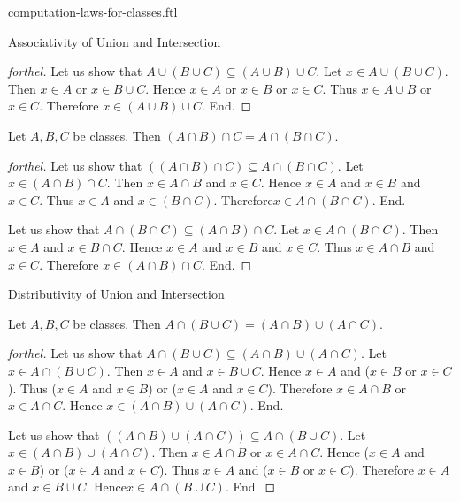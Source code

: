 \documentclass{naproche-library}
\begin{document}
\begin{smodule}[title=Computation Laws For Classes]{computation-laws-for-classes.ftl}
\begin{sfragment}{Associativity of Union and Intersection}
\begin{proof}[forthel]
    Let us show that $A \cup (B \cup C) \subseteq (A \cup B) \cup C$.
      Let $x \in A \cup (B \cup C)$.
      Then $x \in A$ or $x \in B \cup C$.
      Hence $x \in A$ or $x \in B$ or $x \in C$.
      Thus $x \in A \cup B$ or $x \in C$.
      Therefore $x \in (A \cup B) \cup C$.
    End.
  \end{proof}

  \begin{proposition}[forthel,id=FOUNDATIONS_02_906751977193472]
    Let $A, B, C$ be classes.
    Then $(A \cap B) \cap C = A \cap (B \cap C)$.
  \end{proposition}
  \begin{proof}[forthel]
    Let us show that $((A \cap B) \cap C) \subseteq A \cap (B \cap C)$. %
      Let $x \in (A \cap B) \cap C$.
      Then $x \in A \cap B$ and $x \in C$.
      Hence $x \in A$ and $x \in B$ and $x \in C$.
      Thus $x \in A$ and $x \in (B \cap C)$.
      Therefore$ x \in A \cap (B \cap C)$.
    End.

    Let us show that $A \cap (B \cap C) \subseteq (A \cap B) \cap C$.
      Let $x \in A \cap (B \cap C)$.
      Then $x \in A$ and $x \in B \cap C$.
      Hence $x \in A$ and $x \in B$ and $x \in C$.
      Thus $x \in A \cap B$ and $x \in C$.
      Therefore $x \in (A \cap B) \cap C$.
    End.
  \end{proof}
\end{sfragment}

\begin{sfragment}{Distributivity of Union and Intersection}
  \begin{proposition}[forthel,id=FOUNDATIONS_02_371139087958016]
    Let $A, B, C$ be classes.
    Then $A \cap (B \cup C) = (A \cap B) \cup (A \cap C)$.
  \end{proposition}
  \begin{proof}[forthel]
    Let us show that $A \cap (B \cup C) \subseteq (A \cap B) \cup (A \cap C)$.
      Let $x \in A \cap (B \cup C)$.
      Then $x \in A$ and $x \in B \cup C$.
      Hence $x \in A$ and ($x \in B$ or $x \in C$).
      Thus ($x \in A$ and $x \in B$) or ($x \in A$ and $x \in C$).
      Therefore $x \in A \cap B$ or $x \in A \cap C$.
      Hence $x \in (A \cap B) \cup (A \cap C)$.
    End.

    Let us show that $((A \cap B) \cup (A \cap C)) \subseteq A \cap (B \cup C)$. %
      Let $x \in (A \cap B) \cup (A \cap C)$.
      Then $x \in A \cap B$ or $x \in A \cap C$.
      Hence ($x \in A$ and $x \in B$) or ($x \in A$ and $x \in C$).
      Thus $x \in A$ and ($x \in B$ or $x \in C$).
      Therefore $x \in A$ and $x \in B \cup C$.
      Hence$ x \in A \cap (B \cup C)$.
    End.
  \end{proof}


\end{sfragment}
\end{smodule}
\end{document}
